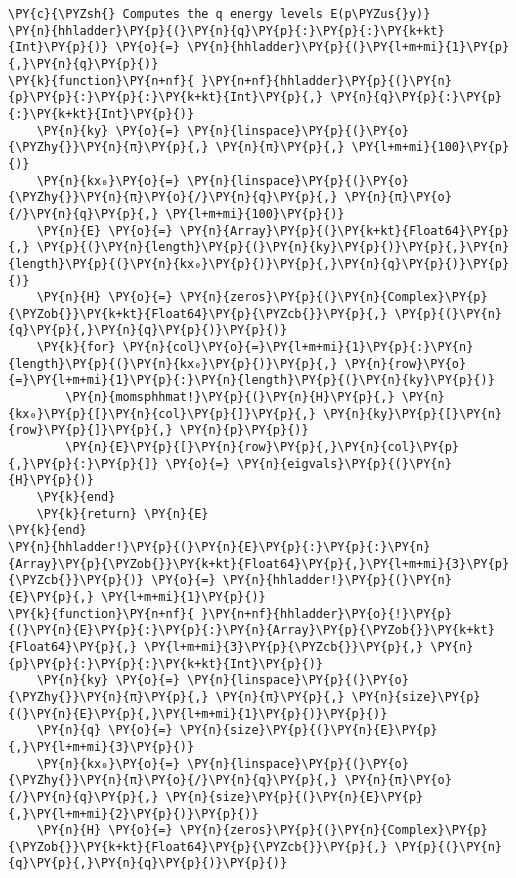 \begin{Verbatim}[commandchars=\\\{\}]
\PY{c}{\PYZsh{} Computes the q energy levels E(p\PYZus{}y)}
\PY{n}{hhladder}\PY{p}{(}\PY{n}{q}\PY{p}{:}\PY{p}{:}\PY{k+kt}{Int}\PY{p}{)} \PY{o}{=} \PY{n}{hhladder}\PY{p}{(}\PY{l+m+mi}{1}\PY{p}{,}\PY{n}{q}\PY{p}{)}
\PY{k}{function}\PY{n+nf}{ }\PY{n+nf}{hhladder}\PY{p}{(}\PY{n}{p}\PY{p}{:}\PY{p}{:}\PY{k+kt}{Int}\PY{p}{,} \PY{n}{q}\PY{p}{:}\PY{p}{:}\PY{k+kt}{Int}\PY{p}{)}
    \PY{n}{ky} \PY{o}{=} \PY{n}{linspace}\PY{p}{(}\PY{o}{\PYZhy{}}\PY{n}{π}\PY{p}{,} \PY{n}{π}\PY{p}{,} \PY{l+m+mi}{100}\PY{p}{)}
    \PY{n}{kx₀}\PY{o}{=} \PY{n}{linspace}\PY{p}{(}\PY{o}{\PYZhy{}}\PY{n}{π}\PY{o}{/}\PY{n}{q}\PY{p}{,} \PY{n}{π}\PY{o}{/}\PY{n}{q}\PY{p}{,} \PY{l+m+mi}{100}\PY{p}{)}
    \PY{n}{E} \PY{o}{=} \PY{n}{Array}\PY{p}{(}\PY{k+kt}{Float64}\PY{p}{,} \PY{p}{(}\PY{n}{length}\PY{p}{(}\PY{n}{ky}\PY{p}{)}\PY{p}{,}\PY{n}{length}\PY{p}{(}\PY{n}{kx₀}\PY{p}{)}\PY{p}{,}\PY{n}{q}\PY{p}{)}\PY{p}{)}
    \PY{n}{H} \PY{o}{=} \PY{n}{zeros}\PY{p}{(}\PY{n}{Complex}\PY{p}{\PYZob{}}\PY{k+kt}{Float64}\PY{p}{\PYZcb{}}\PY{p}{,} \PY{p}{(}\PY{n}{q}\PY{p}{,}\PY{n}{q}\PY{p}{)}\PY{p}{)}
    \PY{k}{for} \PY{n}{col}\PY{o}{=}\PY{l+m+mi}{1}\PY{p}{:}\PY{n}{length}\PY{p}{(}\PY{n}{kx₀}\PY{p}{)}\PY{p}{,} \PY{n}{row}\PY{o}{=}\PY{l+m+mi}{1}\PY{p}{:}\PY{n}{length}\PY{p}{(}\PY{n}{ky}\PY{p}{)}
        \PY{n}{momsphhmat!}\PY{p}{(}\PY{n}{H}\PY{p}{,} \PY{n}{kx₀}\PY{p}{[}\PY{n}{col}\PY{p}{]}\PY{p}{,} \PY{n}{ky}\PY{p}{[}\PY{n}{row}\PY{p}{]}\PY{p}{,} \PY{n}{p}\PY{p}{)}
        \PY{n}{E}\PY{p}{[}\PY{n}{row}\PY{p}{,}\PY{n}{col}\PY{p}{,}\PY{p}{:}\PY{p}{]} \PY{o}{=} \PY{n}{eigvals}\PY{p}{(}\PY{n}{H}\PY{p}{)}
    \PY{k}{end}
    \PY{k}{return} \PY{n}{E}
\PY{k}{end}
\PY{n}{hhladder!}\PY{p}{(}\PY{n}{E}\PY{p}{:}\PY{p}{:}\PY{n}{Array}\PY{p}{\PYZob{}}\PY{k+kt}{Float64}\PY{p}{,}\PY{l+m+mi}{3}\PY{p}{\PYZcb{}}\PY{p}{)} \PY{o}{=} \PY{n}{hhladder!}\PY{p}{(}\PY{n}{E}\PY{p}{,} \PY{l+m+mi}{1}\PY{p}{)}
\PY{k}{function}\PY{n+nf}{ }\PY{n+nf}{hhladder}\PY{o}{!}\PY{p}{(}\PY{n}{E}\PY{p}{:}\PY{p}{:}\PY{n}{Array}\PY{p}{\PYZob{}}\PY{k+kt}{Float64}\PY{p}{,} \PY{l+m+mi}{3}\PY{p}{\PYZcb{}}\PY{p}{,} \PY{n}{p}\PY{p}{:}\PY{p}{:}\PY{k+kt}{Int}\PY{p}{)}
    \PY{n}{ky} \PY{o}{=} \PY{n}{linspace}\PY{p}{(}\PY{o}{\PYZhy{}}\PY{n}{π}\PY{p}{,} \PY{n}{π}\PY{p}{,} \PY{n}{size}\PY{p}{(}\PY{n}{E}\PY{p}{,}\PY{l+m+mi}{1}\PY{p}{)}\PY{p}{)}
    \PY{n}{q} \PY{o}{=} \PY{n}{size}\PY{p}{(}\PY{n}{E}\PY{p}{,}\PY{l+m+mi}{3}\PY{p}{)}
    \PY{n}{kx₀}\PY{o}{=} \PY{n}{linspace}\PY{p}{(}\PY{o}{\PYZhy{}}\PY{n}{π}\PY{o}{/}\PY{n}{q}\PY{p}{,} \PY{n}{π}\PY{o}{/}\PY{n}{q}\PY{p}{,} \PY{n}{size}\PY{p}{(}\PY{n}{E}\PY{p}{,}\PY{l+m+mi}{2}\PY{p}{)}\PY{p}{)}
    \PY{n}{H} \PY{o}{=} \PY{n}{zeros}\PY{p}{(}\PY{n}{Complex}\PY{p}{\PYZob{}}\PY{k+kt}{Float64}\PY{p}{\PYZcb{}}\PY{p}{,} \PY{p}{(}\PY{n}{q}\PY{p}{,}\PY{n}{q}\PY{p}{)}\PY{p}{)}

\end{Verbatim}
